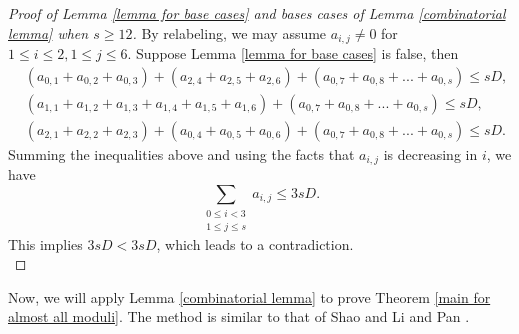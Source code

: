 \documentclass[11pt]{amsart}
\theoremstyle{plain} %
\theoremstyle{remark}
\numberwithin{equation}{section}
\begin{document}
\begin{proof}[Proof of Lemma \ref{lemma for base cases} and bases cases of Lemma \ref{combinatorial lemma} when $s\geq 12$]
    By relabeling, we may assume $a_{i,j}\neq 0$ for $1\leq i\leq 2,1\leq j\leq 6$. Suppose Lemma \ref{lemma for base cases} is false, then
    \begin{align*}
        &(a_{0,1}+a_{0,2}+a_{0,3})+(a_{2,4}+a_{2,5}+a_{2,6})+(a_{0,7}+a_{0,8}+...+a_{0,s})\leq sD,\\
        &(a_{1,1}+a_{1,2}+a_{1,3}+a_{1,4}+a_{1,5}+a_{1,6})+(a_{0,7}+a_{0,8}+...+a_{0,s})\leq sD,\\
        &(a_{2,1}+a_{2,2}+a_{2,3})+(a_{0,4}+a_{0,5}+a_{0,6})+(a_{0,7}+a_{0,8}+...+a_{0,s})\leq sD.
    \end{align*}
    Summing the inequalities above and using the facts that $a_{i,j}$ is decreasing in $i$, we have
    \begin{equation*}
        \sum_{\substack{0\leq i<3\\1\leq j\leq s}}a_{i,j}\leq 3sD.
    \end{equation*}
    This implies $3sD<3sD$, which leads to a contradiction.\\
\end{proof}

Now, we will apply Lemma \ref{combinatorial lemma} to prove Theorem \ref{main for almost all moduli}. The method is similar to that of Shao \cite[Proposition 3.1]{Shao} and Li and Pan \cite[Theorem 1.2]{LiPan}.
\end{document}
